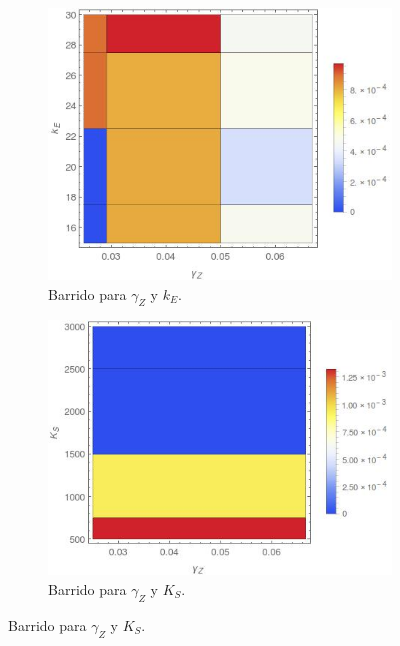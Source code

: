 \documentclass[12pt]{article}
\begin{document}
\begin{figure}[H]
	\begin{subfigure}[b]{0.5\textwidth}
  		\centering
  		\includegraphics[width=\textwidth]{gammaZ-kE.jpeg}
  		\caption{\label{fig:gammaZ-kE} Barrido para $\gamma_Z$ y $k_E$.}
  	\end{subfigure}
	\begin{subfigure}[b]{0.5\textwidth}
		\centering
  		\includegraphics[width=\textwidth]{gammaZ-KS.jpeg}
		\caption{\label{fig:gammaZ-KS} Barrido para $\gamma_Z$ y $K_S$.}
  	\end{subfigure} 	
  	

\end{figure}
\end{document}
